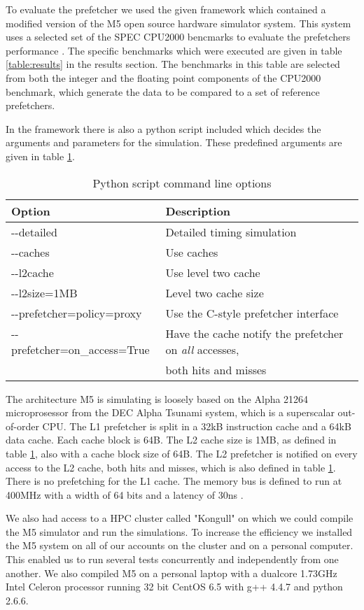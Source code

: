 To evaluate the prefetcher we used the given framework which contained a modified version of the M5 open source hardware simulator system. This system uses a selected set of the SPEC CPU2000 bencmarks to evaluate the prefetchers performance \cite{reference:spec}. The specific benchmarks which were executed are given in table \ref{table:results} in the results section. The benchmarks in this table are selected from both the integer and the floating point components of the CPU2000 benchmark, which generate the data to be compared to a set of reference prefetchers. 

In the framework there is also a python script included which decides the arguments and parameters for the simulation. These predefined arguments are given in table \ref{table:cmdlineopt}.

\begin{table}[!t]
\renewcommand{\arraystretch}{1.3}
\caption{Python script command line options}
\label{table:cmdlineopt}
\centering
\begin{tabular}{l l}
\bfseries Option & \bfseries Description\\
\hline
-\--detailed & Detailed timing simulation\\
-\--caches & Use caches\\
-\--l2cache & Use level two cache\\
-\--l2size=1MB & Level two cache size\\
-\--prefetcher=policy=proxy & Use the C-style prefetcher interface\\
-\--prefetcher=on\_access=True & Have the cache notify the prefetcher on \emph{all} accesses,\\& both hits and misses\\
\hline
\end{tabular}
\end{table}

The architecture M5 is simulating is loosely based on the Alpha 21264 microprosessor from the DEC Alpha Tsunami system, which is a superscalar out-of-order CPU. The L1 prefetcher is split in a 32kB instruction cache and a 64kB data cache. Each cache block is 64B. The L2 cache size is 1MB, as defined in table \ref{table:cmdlineopt}, also with a cache block size of 64B. The L2 prefetcher is notified on every access to the L2 cache, both hits and misses, which is also defined in table \ref{table:cmdlineopt}. There is no prefetching for the L1 cache. The memory bus is defined to run at 400MHz with a width of 64 bits and a latency of 30ns \cite{reference:opg}. 

We also had access to a HPC cluster called "Kongull" on which we could compile the M5 simulator and run the simulations. To increase the efficiency we installed the M5 system on all of our accounts on the cluster and on a personal computer. This enabled us to run several tests concurrently and independently from one another. We also compiled M5 on a personal laptop with a dualcore 1.73GHz Intel Celeron processor running 32 bit CentOS 6.5 with g++ 4.4.7 and python 2.6.6. 


